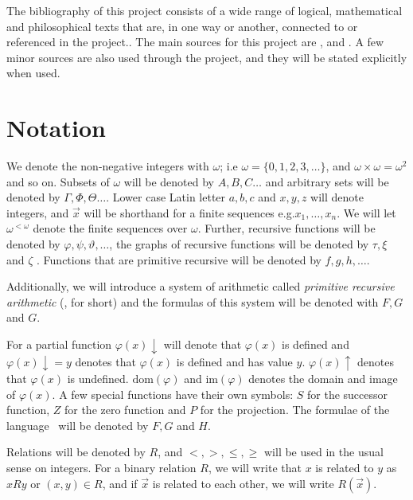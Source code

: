 \documentclass[../main.tex]{subfiles}
\begin{document}
The bibliography of this project consists of a wide range of logical,
mathematical and philosophical texts that are, in one way or another, connected to or referenced in the project.. The main sources for this project
are \parencite{Smor1985}, \parencite{Boolos1993} and \parencite{Soare1987}. A
few minor sources are also used through the project, and they will be stated
explicitly when used.

\section{Notation}

We denote the non-negative integers with $\omega$; i.e
$\omega=\{0,1,2,3,\ldots\}$, and $\omega\times\omega=\omega^2$ and so on.
Subsets of $\omega$ will be denoted by $A,B,C\ldots$ and arbitrary sets will be
denoted by
$\Gamma,\Phi,\Theta\ldots$. Lower case Latin letter $a,b,c$ and $x,y,z$ will
denote integers, and $\vec{x}$ will be shorthand for a finite sequences e.g.$x_1,\ldots,x_n$.
We will let $\omega^{<\omega}$ denote the finite sequences over $\omega$.
Further, recursive functions will be denoted by
$\varphi,\psi,\vartheta,\ldots$, the graphs of recursive functions will be
denoted by $\tau,\xi$ and $\zeta$ . Functions that are primitive recursive will be denoted by
$f,g,h,\ldots$. 

Additionally, we  will introduce a system of arithmetic called \textit{primitive
recursive arithmetic} (\PRA, for short) and the formulas of this
system will be denoted with $F,G$ and $G$.

For a partial function $\varphi(x)\downarrow$ will denote that $\varphi(x)$ is defined and
$\varphi(x)\downarrow=y$ denotes that $\varphi(x)$ is defined and has value $y$.
$\varphi(x)\uparrow$
denotes that $\varphi(x)$ is undefined. $\text{dom}(\varphi)$ and $\text{im}
(\varphi)$ denotes the
domain and image of $\varphi(x)$.
A few special functions have their own symbols: $S$ for the
successor function, $Z$ for the zero function and $P$ for the projection.
The formulae of the language \PRA\ will be denoted by $F,G$ and $H$.

Relations will be denoted by $R$, and $<,>,\leq,\geq$ will be used in the usual
sense on integers. For a binary relation $R$, we will write that $x$ is related
to $y$ as $xRy$ or $(x,y)\in R$, and if $\vec x$ is related to each other, we
will write $R(\vec x)$.
\end{document}
